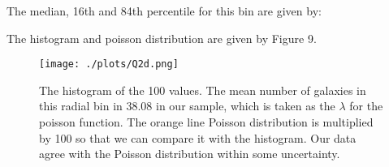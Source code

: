 The median, 16th and 84th percentile for this bin are given by:


The histogram and poisson distribution are given by Figure 9.

\begin{figure}[h!]
  \centering
  \texttt{[image: ./plots/Q2d.png]}
  \caption{The histogram of the 100 values. The mean number of galaxies in this radial bin in 38.08 in our sample, which is taken as the $\lambda$ for the poisson function. The orange line Poisson distribution is multiplied by 100 so that we can compare it with the histogram. Our data agree with the Poisson distribution within some uncertainty. }
  \label{fig9}
\end{figure}

